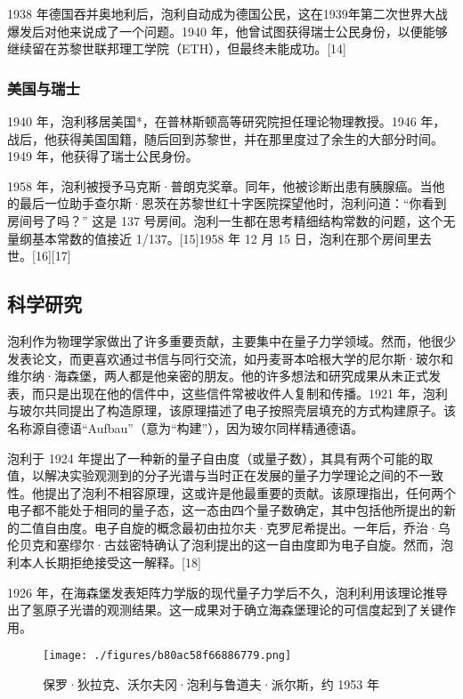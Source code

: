 1938 年德国吞并奥地利后，泡利自动成为德国公民，这在1939年第二次世界大战爆发后对他来说成了一个问题。1940 年，他曾试图获得瑞士公民身份，以便能够继续留在苏黎世联邦理工学院（ETH），但最终未能成功。[14]
\subsubsection{美国与瑞士} 
1940 年，泡利移居美国*，在普林斯顿高等研究院担任理论物理教授。1946 年，战后，他获得美国国籍，随后回到苏黎世，并在那里度过了余生的大部分时间。1949 年，他获得了瑞士公民身份。

1958 年，泡利被授予马克斯·普朗克奖章。同年，他被诊断出患有胰腺癌。当他的最后一位助手查尔斯·恩茨在苏黎世红十字医院探望他时，泡利问道：“你看到房间号了吗？” 这是 137 号房间。泡利一生都在思考精细结构常数的问题，这个无量纲基本常数的值接近 1/137。[15]1958 年 12 月 15 日，泡利在那个房间里去世。[16][17]
\subsection{科学研究}
泡利作为物理学家做出了许多重要贡献，主要集中在量子力学领域。然而，他很少发表论文，而更喜欢通过书信与同行交流，如丹麦哥本哈根大学的尼尔斯·玻尔和维尔纳·海森堡，两人都是他亲密的朋友。他的许多想法和研究成果从未正式发表，而只是出现在他的信件中，这些信件常被收件人复制和传播。1921 年，泡利与玻尔共同提出了构造原理，该原理描述了电子按照壳层填充的方式构建原子。该名称源自德语“Aufbau”（意为“构建”），因为玻尔同样精通德语。

泡利于 1924 年提出了一种新的量子自由度（或量子数），其具有两个可能的取值，以解决实验观测到的分子光谱与当时正在发展的量子力学理论之间的不一致性。他提出了泡利不相容原理，这或许是他最重要的贡献。该原理指出，任何两个电子都不能处于相同的量子态，这一态由四个量子数确定，其中包括他所提出的新的二值自由度。电子自旋的概念最初由拉尔夫·克罗尼希提出。一年后，乔治·乌伦贝克和塞缪尔·古兹密特确认了泡利提出的这一自由度即为电子自旋。然而，泡利本人长期拒绝接受这一解释。[18]  

1926 年，在海森堡发表矩阵力学版的现代量子力学后不久，泡利利用该理论推导出了氢原子光谱的观测结果。这一成果对于确立海森堡理论的可信度起到了关键作用。
\begin{figure}[ht]
\centering
\texttt{[image: ./figures/b80ac58f66886779.png]}
\caption{保罗·狄拉克、沃尔夫冈·泡利与鲁道夫·派尔斯，约 1953 年} \label{fig_Pauli2_3}
\end{figure}
